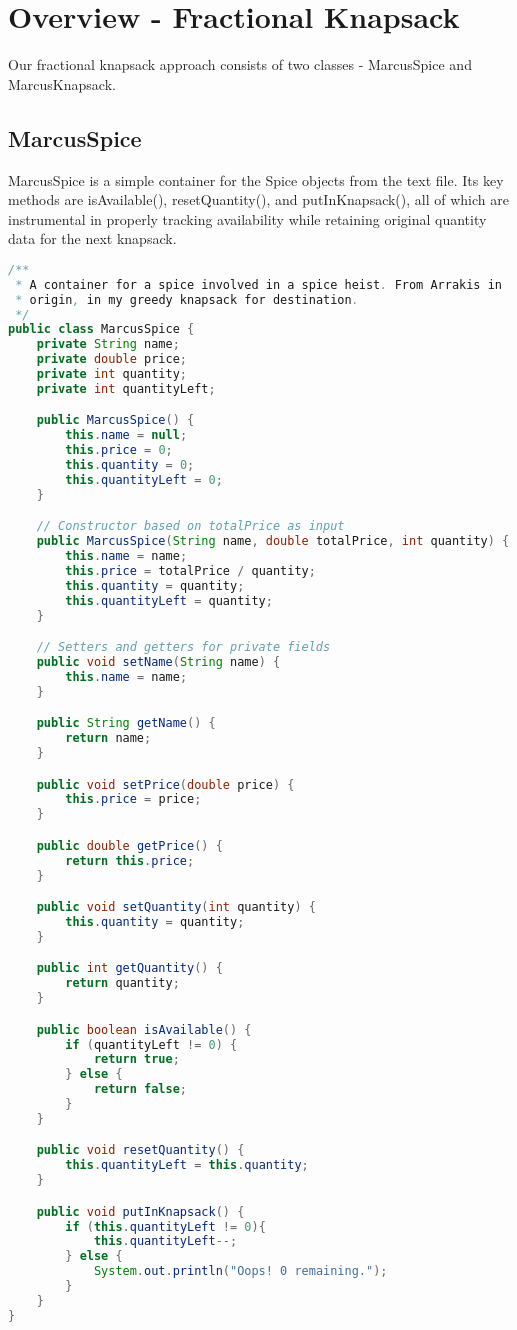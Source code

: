 \documentclass[letterpaper, 10pt]{article}
\begin{document}
\vspace{6.0em}

\section{Overview - Fractional Knapsack}

\hspace{1.0em}Our fractional knapsack approach consists of two classes - MarcusSpice and MarcusKnapsack.

\subsection{MarcusSpice}

\hspace{1.0em}MarcusSpice is a simple container for the Spice objects from the text file. Its key methods are isAvailable(), resetQuantity(), and putInKnapsack(), all of which are instrumental in properly tracking availability while retaining original quantity data for the next knapsack.

\begin{lstlisting}[language=Java, firstnumber=1]
/**
 * A container for a spice involved in a spice heist. From Arrakis in
 * origin, in my greedy knapsack for destination.
 */
public class MarcusSpice {
    private String name;
    private double price;
    private int quantity;
    private int quantityLeft;

    public MarcusSpice() {
        this.name = null;
        this.price = 0;
        this.quantity = 0;
        this.quantityLeft = 0;
    }

    // Constructor based on totalPrice as input
    public MarcusSpice(String name, double totalPrice, int quantity) {
        this.name = name;
        this.price = totalPrice / quantity;
        this.quantity = quantity;
        this.quantityLeft = quantity;
    }

    // Setters and getters for private fields
    public void setName(String name) {
        this.name = name;
    }

    public String getName() {
        return name;
    }

    public void setPrice(double price) {
        this.price = price;
    }

    public double getPrice() {
        return this.price;
    }

    public void setQuantity(int quantity) {
        this.quantity = quantity;
    }

    public int getQuantity() {
        return quantity;
    }

    public boolean isAvailable() {
        if (quantityLeft != 0) {
            return true;
        } else {
            return false;
        }
    }

    public void resetQuantity() {
        this.quantityLeft = this.quantity;
    }

    public void putInKnapsack() {
        if (this.quantityLeft != 0){
            this.quantityLeft--;
        } else {
            System.out.println("Oops! 0 remaining.");
        }
    }
}

\end{lstlisting}
\end{document}
